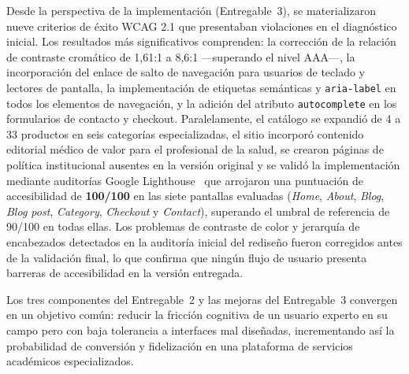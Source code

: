 \documentclass[conference]{IEEEtran}
\begin{document}
Desde la perspectiva de la implementación (Entregable~3), se materializaron nueve criterios de éxito WCAG 2.1 que presentaban violaciones en el diagnóstico inicial. Los resultados más significativos comprenden: la corrección de la relación de contraste cromático de 1,61:1 a 8,6:1 —superando el nivel AAA—, la incorporación del enlace de salto de navegación para usuarios de teclado y lectores de pantalla, la implementación de etiquetas semánticas y \texttt{aria-label} en todos los elementos de navegación, y la adición del atributo \texttt{autocomplete} en los formularios de contacto y checkout. Paralelamente, el catálogo se expandió de 4 a 33 productos en seis categorías especializadas, el sitio incorporó contenido editorial médico de valor para el profesional de la salud, se crearon páginas de política institucional ausentes en la versión original y se validó la implementación mediante auditorías Google Lighthouse~\cite{lighthouse} que arrojaron una puntuación de accesibilidad de \textbf{100/100} en las siete pantallas evaluadas (\textit{Home}, \textit{About}, \textit{Blog}, \textit{Blog post}, \textit{Category}, \textit{Checkout} y \textit{Contact}), superando el umbral de referencia de 90/100 en todas ellas. Los problemas de contraste de color y jerarquía de encabezados detectados en la auditoría inicial del rediseño fueron corregidos antes de la validación final, lo que confirma que ningún flujo de usuario presenta barreras de accesibilidad en la versión entregada.

Los tres componentes del Entregable~2 y las mejoras del Entregable~3 convergen en un objetivo común: reducir la fricción cognitiva de un usuario experto en su campo pero con baja tolerancia a interfaces mal diseñadas, incrementando así la probabilidad de conversión y fidelización en una plataforma de servicios académicos especializados.
\end{document}
